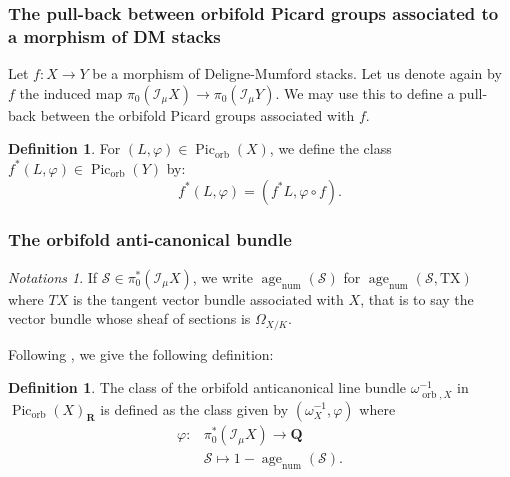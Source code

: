 \documentclass{proc-l}
\newcommand{\R}{\mathbf{R}}
\newcommand{\Z}{\mathbf{Z}}
\newcommand{\Q}{\mathbf{Q}}
\DeclareMathOperator{\Pic}{Pic}
\DeclareMathOperator{\num}{num}
\DeclareMathOperator{\age}{age}
\DeclareMathOperator{\orb}{orb}
\newcommand{\stackS}{\mathcal{S}}
\newcommand{\sheafI}{\mathcal{I}}
\newcommand{\w}{\omega}
\newcommand{\sector}{\pi_0(\sheafI_{\mu} X)}
\newcommand{\twistsector}{\pi_0^*(\sheafI_{\mu} X)}
\theoremstyle{definition}
\newtheorem{definition}[theorem]{Definition}
\theoremstyle{remark}
\newtheorem{Notations}[theorem]{Notations}
\numberwithin{equation}{section}
\begin{document}
\subsubsection{The pull-back between orbifold Picard groups associated to a morphism of DM stacks}

Let $f : X \rightarrow Y$ be a morphism of Deligne-Mumford stacks. Let us denote again by $f$ the induced map $ \sector \rightarrow \pi_0( \sheafI_{\mu} Y)$. We may use this to define a pull-back between the orbifold Picard groups associated with $f$. 


\begin{definition}
    For $(L,\varphi) \in \Pic_{\orb}(X)$, we define the class $f^*(L,\varphi) \in \Pic_{\orb}(Y)$ by:
    $$f^*(L,\varphi) = (f^*L,\varphi \circ f) .$$
\end{definition}

\subsubsection{The orbifold anti-canonical bundle}

\begin{Notations}\label{notation_numerical_age_tangent_bundle}
If $\stackS \in \twistsector$, we write $\age_{\num}(\stackS)$ for $\age_{\num}(\stackS,\text{TX})$ where $TX$ is the tangent vector bundle associated with $X$, that is to say the vector bundle whose sheaf of sections is $\Omega_{X/K}$.  
\end{Notations}

Following \cite[Definition 9.1]{darda2024batyrevmanin}, we give the following definition:

 \begin{definition}\label{definition_anti_canonical_orbifold}
     The class of the orbifold anticanonical line bundle $\w_{\orb,X}^{-1} $ in $\Pic_{\orb}(X)_{\R}$ is defined as the class given by $(\w_{X}^{-1},\varphi)$ where \begin{align*}
         \varphi : &\twistsector \rightarrow \Q \\
         &\stackS \longmapsto 1 - \age_{\num}(\stackS) .
     \end{align*}
\end{definition}

\end{document}
